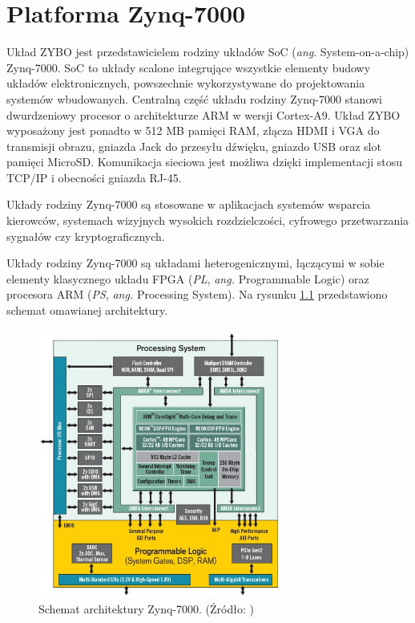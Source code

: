 \chapter{Platforma Zynq-7000}
\label{cha:platform}

Układ ZYBO jest przedstawicielem rodziny układów SoC (\emph{ang}. System-on-a-chip) Zynq-7000. %
SoC to układy scalone integrujące wszystkie elementy budowy układów elektronicznych, powszechnie wykorzystywane do projektowania systemów wbudowanych. %
Centralną część układu rodziny Zynq-7000 stanowi dwurdzeniowy procesor o architekturze ARM w wersji Cortex-A9. \cite{zynq-homepage} %
Układ ZYBO wyposażony jest ponadto w 512 MB pamięci RAM, złącza HDMI i VGA do transmisji obrazu, gniazda Jack do przesyłu dźwięku, gniazdo USB oraz slot pamięci MicroSD. %
Komunikacja sieciowa jest możliwa dzięki implementacji stosu TCP/IP i obecności gniazda RJ-45. \cite{zynq-datasheet}

Układy rodziny Zynq-7000 są stosowane w aplikacjach systemów wsparcia kierowców, systemach wizyjnych wysokich rozdzielczości, cyfrowego przetwarzania sygnałów czy kryptograficznych. \cite{GuanwenZhong,MaleenAbeydeera,PawelDabal2014} %

Układy rodziny Zynq-7000 są układami heterogenicznymi, łączącymi w sobie elementy klasycznego układu FPGA (\emph{PL}, \emph{ang.} Programmable Logic) oraz procesora ARM (\emph{PS}, \emph{ang.} Processing System). %
Na rysunku \ref{fig:zynq-overview} przedstawiono schemat omawianej architektury.

\begin{figure}[h]
	\centering
	\includegraphics[width=8cm]{img/zyng-platform.png}
	\caption{Schemat architektury Zynq-7000. (Źródło: \cite{zybo-reference-manual})}
	\label{fig:zynq-overview}
\end{figure}

